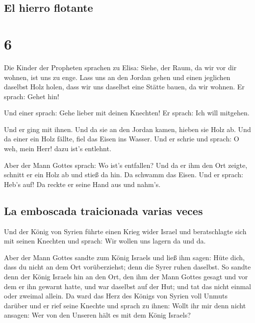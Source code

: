 \hypertarget{el-hierro-flotante}{%
\subsection{El hierro flotante}\label{el-hierro-flotante}}

\hypertarget{section-5}{%
\section{6}\label{section-5}}

 Die Kinder der Propheten sprachen zu Elisa: Siehe, der
Raum, da wir vor dir wohnen, ist uns zu enge.  Lass uns an
den Jordan gehen und einen jeglichen daselbst Holz holen, dass wir uns
daselbst eine Stätte bauen, da wir wohnen. Er sprach: Gehet hin!

 Und einer sprach: Gehe lieber mit deinen Knechten! Er
sprach: Ich will mitgehen.

 Und er ging mit ihnen. Und da sie an den Jordan kamen,
hieben sie Holz ab.  Und da einer ein Holz fällte, fiel
das Eisen ins Wasser. Und er schrie und sprach: O weh, mein Herr! dazu
ist's entlehnt.

 Aber der Mann Gottes sprach: Wo ist's entfallen? Und da
er ihm den Ort zeigte, schnitt er ein Holz ab und stieß da hin. Da
schwamm das Eisen.  Und er sprach: Heb's auf! Da reckte er
seine Hand aus und nahm's.

\hypertarget{la-emboscada-traicionada-varias-veces}{%
\subsection{La emboscada traicionada varias
veces}\label{la-emboscada-traicionada-varias-veces}}

 Und der König von Syrien führte einen Krieg wider Israel
und beratschlagte sich mit seinen Knechten und sprach: Wir wollen uns
lagern da und da.

 Aber der Mann Gottes sandte zum König Israels und ließ
ihm sagen: Hüte dich, dass du nicht an dem Ort vorüberziehst; denn die
Syrer ruhen daselbst.  So sandte denn der König Israels
hin an den Ort, den ihm der Mann Gottes gesagt und vor dem er ihn
gewarnt hatte, und war daselbst auf der Hut; und tat das nicht einmal
oder zweimal allein.  Da ward das Herz des Königs von
Syrien voll Unmuts darüber und er rief seine Knechte und sprach zu
ihnen: Wollt ihr mir denn nicht ansagen: Wer von den Unseren hält es mit
dem König Israels?

